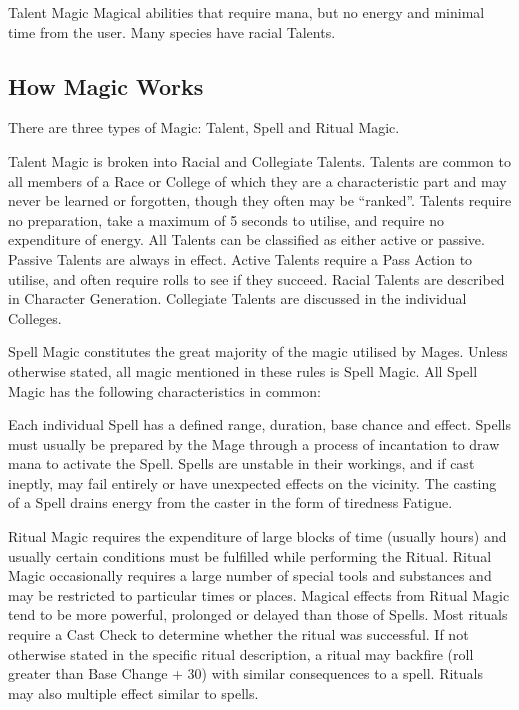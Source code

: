 \begin{multicols*}{3}
\begin{Description}
\item[Talent Magic] Magical abilities that require mana, but no energy
and minimal time from the user. Many species have racial Talents.

\end{Description}

\subsection{How Magic Works}
\label{magic:howmagicworks}

There are three types of Magic: Talent, Spell and Ritual Magic.

Talent Magic is broken into Racial and Collegiate Talents.  Talents
are common to all members of a Race or College of which they are a
characteristic part and may never be learned or forgotten, though they
often may be ``ranked''. Talents require no preparation, take a
maximum of 5 seconds to utilise, and require no expenditure of
energy. All Talents can be classified as either active or
passive. Passive Talents are always in effect. Active Talents require
a Pass Action to utilise, and often require rolls to see if they
succeed. Racial Talents are described in Character
Generation. Collegiate Talents are discussed in the individual
Colleges.

Spell Magic constitutes the great majority of the magic utilised by
Mages. Unless otherwise stated, all magic mentioned in these rules is
Spell Magic. All Spell Magic has the following characteristics in
common:

Each individual Spell has a defined range, duration, base chance and
effect. Spells must usually be prepared by the Mage through a process
of incantation to draw mana to activate the Spell. Spells are unstable
in their workings, and if cast ineptly, may fail entirely or have
unexpected effects on the vicinity. The casting of a Spell drains
energy from the caster in the form of tiredness Fatigue.

Ritual Magic requires the expenditure of large blocks of time (usually
hours) and usually certain conditions must be fulfilled while
performing the Ritual. Ritual Magic occasionally requires a large
number of special tools and substances and may be restricted to
particular times or places. Magical effects from Ritual Magic tend to
be more powerful, prolonged or delayed than those of Spells. Most
rituals require a Cast Check to determine whether the ritual was
successful. If not otherwise stated in the specific ritual
description, a ritual may backfire (roll greater than Base Change +
30) with similar consequences to a spell.  Rituals may also multiple
effect similar to spells.


\end{multicols*}
